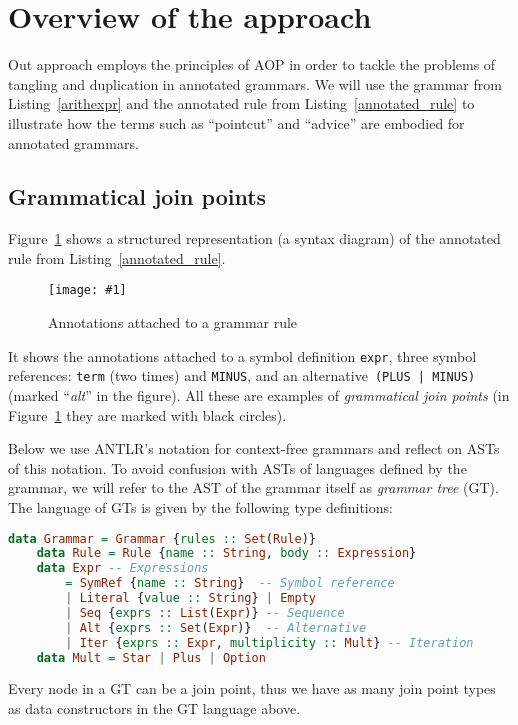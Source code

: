 \documentclass{IOS-Book-Article}     %
\newcommand{\fig}[2]{%
\begin{figure}%
\centering%
\texttt{[image: \#1]}%
\caption{#2}\label{#1}%
\end{figure}%
}
\newcommand{\lstref}[1]{Listing~\ref{#1}}
\newcommand{\figref}[1]{Figure~\ref{#1}}
\newcommand{\tool}[1]{\textsc{#1}}
\begin{document}
\section{Overview of the approach}\label{Approach}

Out approach employs the principles of AOP in order to tackle the problems of tangling and duplication in annotated grammars. We will use the grammar from \lstref{arithexpr} and the annotated rule from \lstref{annotated_rule} to illustrate how the terms such as ``pointcut'' and ``advice'' are embodied for annotated grammars. 

\subsection{Grammatical join points}
\figref{structured} shows a structured representation (a syntax diagram) of the annotated rule from \lstref{annotated_rule}. 
\fig{structured}{Annotations attached to a grammar rule}
It shows the annotations attached to a symbol definition \texttt{expr}, three symbol references: \texttt{term} (two times) and \texttt{MINUS}, and an alternative~\mbox{\texttt{(PLUS | MINUS)}} (marked ``\emph{alt}'' in the figure). All these are examples of \emph{grammatical join points} (in \figref{structured} they are marked with black circles). 

Below we use \tool{ANTLR}'s notation for context-free grammars and reflect on ASTs of this notation. To avoid confusion with ASTs of languages defined by the grammar, we will refer to the AST of the grammar itself as \emph{grammar tree} (GT). The language of GTs is given by the following type definitions:
\begin{lstlisting}[language=Haskell]
	data Grammar = Grammar {rules :: Set(Rule)}
	data Rule = Rule {name :: String, body :: Expression}
	data Expr -- Expressions
		= SymRef {name :: String}  -- Symbol reference
		| Literal {value :: String} | Empty
		| Seq {exprs :: List(Expr)} -- Sequence
		| Alt {exprs :: Set(Expr)}  -- Alternative
		| Iter {exprs :: Expr, multiplicity :: Mult} -- Iteration
	data Mult = Star | Plus | Option
\end{lstlisting}
Every node in a GT can be a join point, thus we have as many join point types as data constructors in the GT language above.
\end{document}
